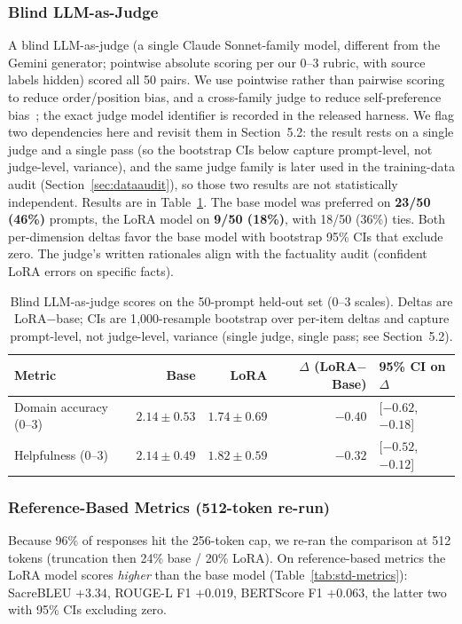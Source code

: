 \documentclass[11pt, a4paper]{article}
\begin{document}
\subsubsection{Blind LLM-as-Judge}
A blind LLM-as-judge (a single Claude Sonnet-family model, different from the Gemini generator; pointwise absolute scoring per our 0--3 rubric, with source labels hidden) scored all 50 pairs. We use pointwise rather than pairwise scoring to reduce order/position bias, and a cross-family judge to reduce self-preference bias~\cite{panickssery2024}; the exact judge model identifier is recorded in the released harness. We flag two dependencies here and revisit them in Section~5.2: the result rests on a single judge and a single pass (so the bootstrap CIs below capture prompt-level, not judge-level, variance), and the same judge family is later used in the training-data audit (Section~\ref{sec:dataaudit}), so those two results are not statistically independent. Results are in Table~\ref{tab:judge}. The base model was preferred on \textbf{23/50 (46\%)} prompts, the LoRA model on \textbf{9/50 (18\%)}, with 18/50 (36\%) ties. Both per-dimension deltas favor the base model with bootstrap 95\% CIs that exclude zero. The judge's written rationales align with the factuality audit (confident LoRA errors on specific facts).

\begin{table}[H]
\centering
\caption{Blind LLM-as-judge scores on the 50-prompt held-out set (0--3 scales). Deltas are LoRA$-$base; CIs are 1{,}000-resample bootstrap over per-item deltas and capture prompt-level, not judge-level, variance (single judge, single pass; see Section~5.2).}
\label{tab:judge}
\begin{tabular}{lrrrl}
\hline
\textbf{Metric} & \textbf{Base} & \textbf{LoRA} & \textbf{$\Delta$ (LoRA$-$Base)} & \textbf{95\% CI on $\Delta$} \\
\hline
Domain accuracy (0--3) & $2.14 \pm 0.53$ & $1.74 \pm 0.69$ & $-0.40$ & [$-0.62$, $-0.18$] \\
Helpfulness (0--3)     & $2.14 \pm 0.49$ & $1.82 \pm 0.59$ & $-0.32$ & [$-0.52$, $-0.12$] \\
\hline
\end{tabular}
\end{table}

\subsubsection{Reference-Based Metrics (512-token re-run)}
Because 96\% of responses hit the 256-token cap, we re-ran the comparison at 512 tokens (truncation then 24\% base / 20\% LoRA). On reference-based metrics the LoRA model scores \emph{higher} than the base model (Table~\ref{tab:std-metrics}): SacreBLEU $+3.34$, ROUGE-L F1 $+0.019$, BERTScore F1 $+0.063$, the latter two with 95\% CIs excluding zero.
\end{document}
